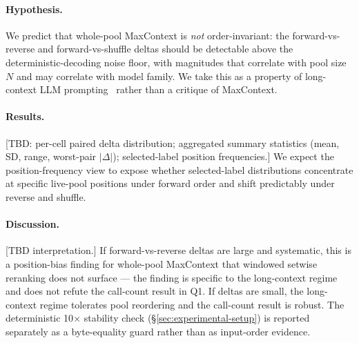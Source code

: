 \paragraph{Hypothesis.}
We predict that whole-pool MaxContext is \emph{not} order-invariant: the forward-vs-reverse and forward-vs-shuffle deltas should be detectable above the deterministic-decoding noise floor, with magnitudes that correlate with pool size $N$ and may correlate with model family. We take this as a property of long-context LLM prompting~\citep{liu2024lostmiddle,tang2024foundmiddle,zheng2024mcqbias,shi2025positionbias,pradeep2023rankzephyr} rather than a critique of MaxContext.

\paragraph{Results.}
[TBD: per-cell paired delta distribution; aggregated summary statistics (mean, SD, range, worst-pair $|\Delta|$); selected-label position frequencies.] We expect the position-frequency view to expose whether selected-label distributions concentrate at specific live-pool positions under forward order and shift predictably under reverse and shuffle.

\paragraph{Discussion.}
[TBD interpretation.] If forward-vs-reverse deltas are large and systematic, this is a position-bias finding for whole-pool MaxContext that windowed setwise reranking does not surface --- the finding is specific to the long-context regime and does not refute the call-count result in Q1. If deltas are small, the long-context regime tolerates pool reordering and the call-count result is robust. The deterministic 10$\times$ stability check (\S\ref{sec:experimental-setup}) is reported separately as a byte-equality guard rather than as input-order evidence.
